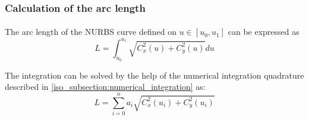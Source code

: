 \subsubsection{Calculation of the arc length}
\paragraph{}
The arc length of the NURBS curve defined on $u \in [u_0, u_1]$ can be expressed as
    \begin{equation}
        L = \int_{u_0} ^{u_1} \sqrt{C_x^2(u) + C_y^2(u)} du
    \end{equation}

The integration can be solved by the help of the numerical integration quadrature described in \ref{iso_subsection:numerical_integration} as:
    \begin{equation}
        L = \sum_{i=0}^n a_i \sqrt{C_x^2(u_i) + C_y^2(u_i)}
    \end{equation}


